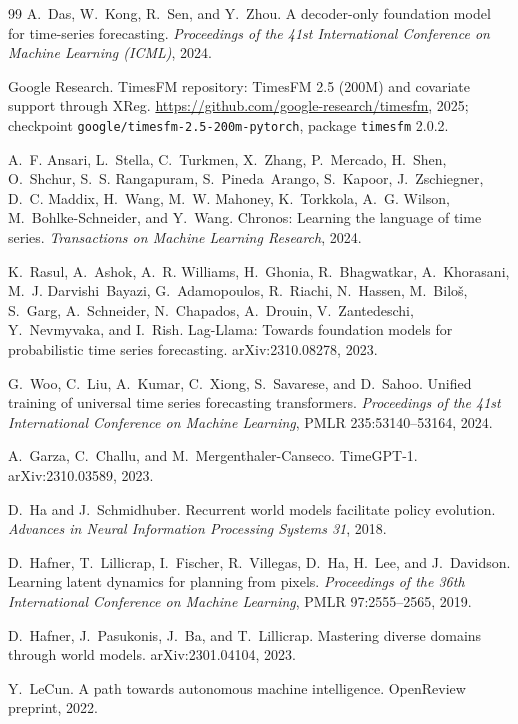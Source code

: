 \begin{thebibliography}{99}
 A.~Das, W.~Kong, R.~Sen, and Y.~Zhou. A decoder-only foundation model for time-series forecasting. \emph{Proceedings of the 41st International Conference on Machine Learning (ICML)}, 2024.

 Google Research. TimesFM repository: TimesFM 2.5 (200M) and covariate support through XReg. \url{https://github.com/google-research/timesfm}, 2025; checkpoint \texttt{google/timesfm-2.5-200m-pytorch}, package \texttt{timesfm} 2.0.2.

 A.~F. Ansari, L.~Stella, C.~Turkmen, X.~Zhang, P.~Mercado, H.~Shen, O.~Shchur, S.~S. Rangapuram, S.~Pineda~Arango, S.~Kapoor, J.~Zschiegner, D.~C. Maddix, H.~Wang, M.~W. Mahoney, K.~Torkkola, A.~G. Wilson, M.~Bohlke-Schneider, and Y.~Wang. Chronos: Learning the language of time series. \emph{Transactions on Machine Learning Research}, 2024.

 K.~Rasul, A.~Ashok, A.~R. Williams, H.~Ghonia, R.~Bhagwatkar, A.~Khorasani, M.~J. Darvishi~Bayazi, G.~Adamopoulos, R.~Riachi, N.~Hassen, M.~Bilo\v{s}, S.~Garg, A.~Schneider, N.~Chapados, A.~Drouin, V.~Zantedeschi, Y.~Nevmyvaka, and I.~Rish. Lag-Llama: Towards foundation models for probabilistic time series forecasting. arXiv:2310.08278, 2023.

 G.~Woo, C.~Liu, A.~Kumar, C.~Xiong, S.~Savarese, and D.~Sahoo. Unified training of universal time series forecasting transformers. \emph{Proceedings of the 41st International Conference on Machine Learning}, PMLR 235:53140--53164, 2024.

 A.~Garza, C.~Challu, and M.~Mergenthaler-Canseco. TimeGPT-1. arXiv:2310.03589, 2023.

 D.~Ha and J.~Schmidhuber. Recurrent world models facilitate policy evolution. \emph{Advances in Neural Information Processing Systems 31}, 2018.

 D.~Hafner, T.~Lillicrap, I.~Fischer, R.~Villegas, D.~Ha, H.~Lee, and J.~Davidson. Learning latent dynamics for planning from pixels. \emph{Proceedings of the 36th International Conference on Machine Learning}, PMLR 97:2555--2565, 2019.

 D.~Hafner, J.~Pasukonis, J.~Ba, and T.~Lillicrap. Mastering diverse domains through world models. arXiv:2301.04104, 2023.

 Y.~LeCun. A path towards autonomous machine intelligence. OpenReview preprint, 2022.


\end{thebibliography}
